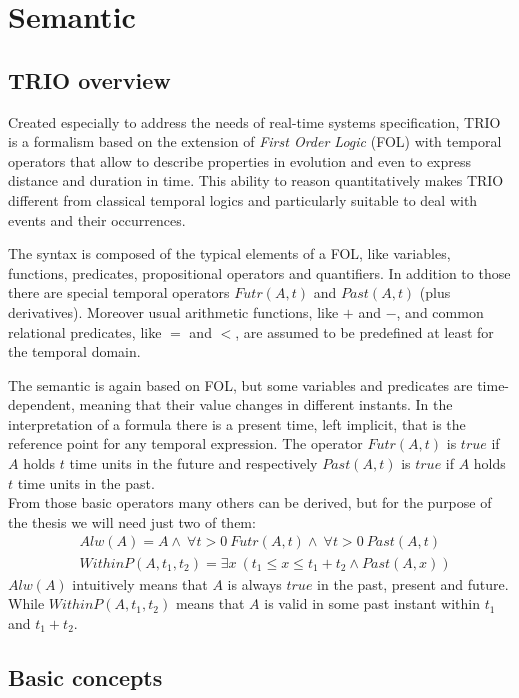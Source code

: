 \section{Semantic}

\subsection{TRIO overview}
Created especially to address the needs of real-time systems specification, TRIO \cite{trio} is a formalism based on the extension of \emph{First Order Logic} (FOL) with temporal operators that allow to describe properties in evolution and even to express distance and duration in time. This ability to reason quantitatively makes TRIO different from classical temporal logics and particularly suitable to deal with events and their occurrences.

The syntax is composed of the typical elements of a FOL, like variables, functions, predicates, propositional operators and quantifiers. In addition to those there are special temporal operators $Futr(A, t)$ and $Past(A, t)$ (plus derivatives). Moreover usual arithmetic functions, like $+$ and $-$, and common relational predicates, like $=$ and $<$, are assumed to be predefined at least for the temporal domain.

The semantic is again based on FOL, but some variables and predicates are time-dependent, meaning that their value changes in different instants. In the interpretation of a formula there is a present time, left implicit, that is the reference point for any temporal expression. The operator $Futr(A, t)$ is $true$ if $A$ holds $t$ time units in the future and respectively $Past(A, t)$ is $true$ if $A$ holds $t$ time units in the past.\\
From those basic operators many others can be derived, but for the purpose of the thesis we will need just two of them:
\begin{align*}
&Alw(A) = A \wedge\ \forall t > 0\ Futr(A,t) \wedge\ \forall t > 0\ Past(A, t)\\
&WithinP(A, t_1, t_2) = \exists x\ (t_1 \le x \le t_1 + t_2 \wedge Past(A,x))
\end{align*}
$Alw(A)$ intuitively means that $A$ is always $true$ in the past, present and future. While $WithinP(A, t_1, t_2)$ means that $A$ is valid in some past instant within $t_1$ and $t_1 + t_2$.

\subsection{Basic concepts}
